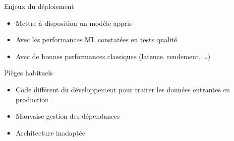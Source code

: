 \begin{frame}{Enjeux du déploiement}
  \begin{itemize}
    \item Mettre à disposition un modèle appris
    \item Avec les performances ML constatées en tests qualité
    \item Avec de bonnes performances classiques (latence, rendement, …)
  \end{itemize}
\end{frame}

\begin{frame}{Pièges habituels}
  \begin{itemize}
    \item Code différent du développement pour traiter les données entrantes en production
    \item Mauvaise gestion des dépendances
    \item Architecture inadaptée
  \end{itemize}
\end{frame}
